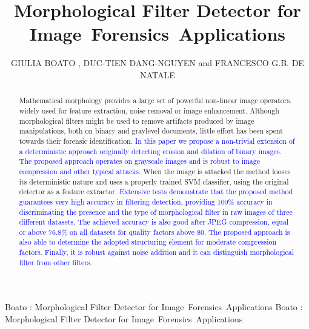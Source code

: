 \documentclass{ieeeaccess}
\begin{document}

\title{Morphological Filter Detector for Image~Forensics~Applications}
\author{\uppercase{Giulia Boato} ,
\uppercase{Duc-Tien Dang-Nguyen}  and \uppercase{Francesco G.B. De Natale}}
\address[1]{University of Trento, Italy (e-mail: giulia.boato@unitn.it; francesco.denatale@unitn.it)}
\address[2]{University of Bergen, Norway(e-mail: ductien.dangnguyen@uib.no)}

\markboth
{Boato \headeretal: Morphological Filter Detector for Image~Forensics~Applications}
{Boato \headeretal: Morphological Filter Detector for Image~Forensics~Applications}


\begin{abstract}
Mathematical morphology provides a large set of powerful non-linear image operators, widely used for feature extraction, noise removal or image enhancement. Although morphological filters might be used to remove artifacts produced by image manipulations, both on binary and graylevel documents, little effort has been spent towards their forensic identification. \textcolor{blue}{In this paper we propose a non-trivial extension of a deterministic approach originally detecting erosion and dilation of binary images.
The proposed approach operates on grayscale images and is robust to image compression and other typical attacks.} When the image is attacked the method looses its deterministic nature and uses a properly trained SVM classifier, using the original detector as a feature extractor. \textcolor{blue}{Extensive tests demonstrate that the proposed method guarantees very high accuracy in filtering detection, providing 100\% accuracy in discriminating the presence and
the type of morphological filter in raw images of three different datasets. The achieved accuracy is also good after JPEG compression, equal or above 76.8\% on all datasets for quality factors above 80. The proposed approach is also able to determine the adopted structuring element for moderate compression factors. Finally, it is robust against noise addition and it can distinguish morphological filter from other filters.}
\end{abstract}
\end{document}
